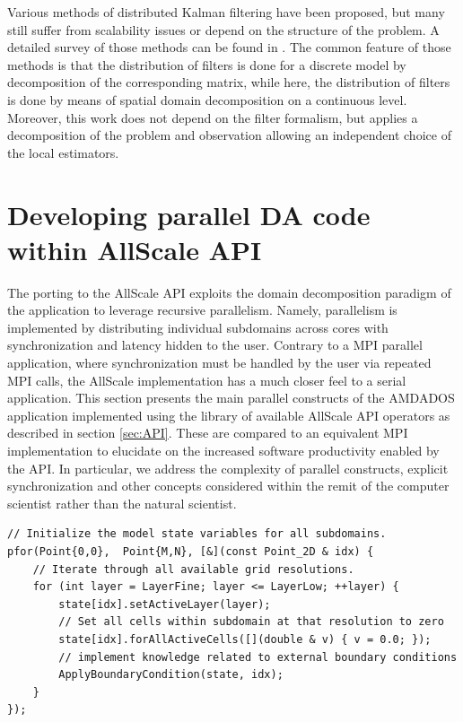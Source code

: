 \documentclass[conference,compsoc]{IEEEtran}
\begin{document}
Various methods of distributed Kalman filtering have been proposed, but many still suffer from scalability issues or depend on the structure of the problem. A detailed survey of those methods can be found in \cite{mahmoud2013distributed}. The common feature of those methods is that the distribution of filters is done for a discrete model by decomposition of the corresponding matrix, while here, the distribution of filters is done by means of spatial domain decomposition on
a continuous level. Moreover, this work does not depend on the filter formalism,
but applies a decomposition of the problem and observation allowing an independent choice of the local estimators.

\section{Developing parallel DA code within AllScale API}
\label{sec:porting}


The porting to the AllScale API exploits the domain decomposition paradigm of the application to leverage recursive parallelism. Namely, parallelism is implemented by distributing individual subdomains across cores with synchronization and latency hidden to the user. Contrary to a MPI parallel application, where synchronization must be handled by the user via repeated MPI calls, the AllScale implementation has a much closer feel to a serial application. This section presents the main parallel constructs of the AMDADOS application implemented using the library of available AllScale API operators as described in section \ref{sec:API}. These are compared to an equivalent MPI implementation to elucidate on the increased software productivity enabled by the API. In particular, we address the complexity of parallel constructs, explicit synchronization and other concepts considered within the remit of the computer scientist rather than the natural scientist.


\begin{lstlisting}[caption=Sample code to initialize concentrations on all subdomains , label=initAllSc]
// Initialize the model state variables for all subdomains.
pfor(Point{0,0},  Point{M,N}, [&](const Point_2D & idx) {
    // Iterate through all available grid resolutions.
    for (int layer = LayerFine; layer <= LayerLow; ++layer) {
        state[idx].setActiveLayer(layer);
        // Set all cells within subdomain at that resolution to zero
        state[idx].forAllActiveCells([](double & v) { v = 0.0; });
        // implement knowledge related to external boundary conditions
        ApplyBoundaryCondition(state, idx);
    }
});
\end{lstlisting}
\end{document}
